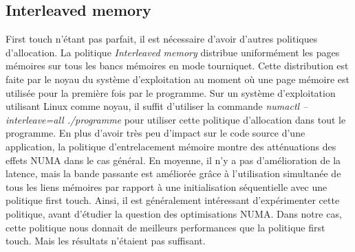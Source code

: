 \subsection{Interleaved memory}
First touch n'étant pas parfait, il est nécessaire d'avoir d'autres politiques d'allocation.
%
La politique {\em Interleaved memory} distribue uniformément les pages mémoires sur tous les bancs mémoires en mode tourniquet.
%
Cette distribution est faite par le noyau du système d'exploitation au moment où une page mémoire est utilisée pour la première fois par le programme.
%
Sur un système d'exploitation utilisant Linux comme noyau, il suffit d'utiliser la commande {\em numactl --interleave=all ./programme} pour utiliser cette politique d'allocation dans tout le programme.
%
En plus d'avoir très peu d'impact sur le code source d'une application, la politique d'entrelacement mémoire montre des atténuations des effets NUMA dans le cas général.
%
En moyenne, il n'y a pas d'amélioration de la latence, mais la bande passante est améliorée grâce à l'utilisation simultanée de tous les liens mémoires par rapport à une initialisation séquentielle avec une politique first touch.
%
Ainsi, il est généralement intéressant d'expérimenter cette politique, avant d'étudier la question des optimisations NUMA.
%
Dans notre cas, cette politique nous donnait de meilleurs performances que la politique first touch.
%
Mais les résultats n'étaient pas suffisant.
